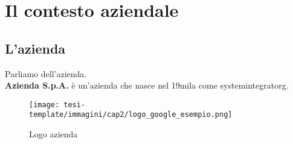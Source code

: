 
\chapter{Il contesto aziendale}
\label{cap:contesto}






\section{L'azienda}
\label{sec:azienda}

Parliamo dell'azienda.\\
\textbf{Azienda S.p.A.} è un'azienda che nasce nel 19mila come \gls{systemintegratorg}\glsfirstoccur.\\


\begin{figure}[!h]
	\centering
	\texttt{[image: tesi-template/immagini/cap2/logo\_google\_esempio.png]}
	\caption{Logo azienda}
	\label{fig:google-logo}
\end{figure}

\newpage


